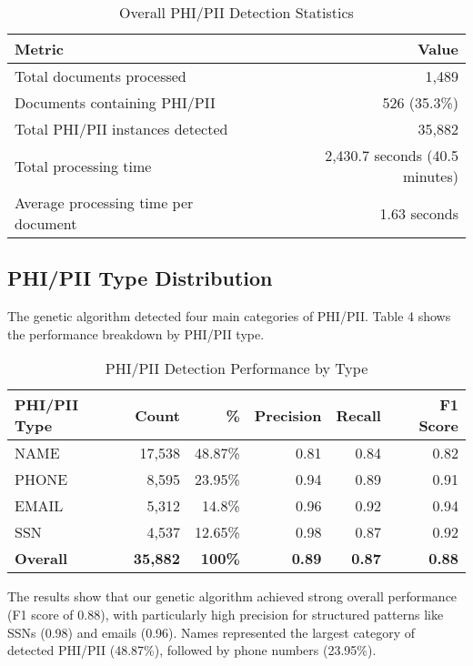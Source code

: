 \documentclass[conference]{IEEEtran}
\begin{document}
\begin{table}[htbp]
\caption{Overall PHI/PII Detection Statistics}
\centering
\renewcommand{\arraystretch}{2.5}
\begin{tabular}{|l|r|}
\hline
\textbf{Metric} & \textbf{Value} \\
\hline
Total documents processed & 1,489 \\
Documents containing PHI/PII & 526 (35.3\%) \\
Total PHI/PII instances detected & 35,882 \\
Total processing time & 2,430.7 seconds (40.5 minutes) \\
Average processing time per document & 1.63 seconds \\
\hline
\end{tabular}
\label{tab:overall-stats}
\end{table}

\subsection{\textbf{PHI/PII Type Distribution}}
The genetic algorithm detected four main categories of PHI/PII. Table 4 shows the performance breakdown by PHI/PII type.

\begin{table}[htbp]
\caption{PHI/PII Detection Performance by Type}
\centering
\renewcommand{\arraystretch}{2.5}
\begin{tabular}{|l|r|r|r|r|r|}
\hline
\textbf{PHI/PII Type} & \textbf{Count} & \textbf{\%} & \textbf{Precision} & \textbf{Recall} & \textbf{F1 Score} \\
\hline
NAME & 17,538 & 48.87\% & 0.81 & 0.84 & 0.82 \\
PHONE & 8,595 & 23.95\% & 0.94 & 0.89 & 0.91 \\
EMAIL & 5,312 & 14.8\% & 0.96 & 0.92 & 0.94 \\
SSN & 4,537 & 12.65\% & 0.98 & 0.87 & 0.92 \\
\textbf{Overall} & \textbf{35,882} & \textbf{100\%} & \textbf{0.89} & \textbf{0.87} & \textbf{0.88} \\
\hline
\end{tabular}
\label{tab:phi-pii-performance}
\end{table}

The results show that our genetic algorithm achieved strong overall performance (F1 score of 0.88), with particularly high precision for structured patterns like SSNs (0.98) and emails (0.96). Names represented the largest category of detected PHI/PII (48.87\%), followed by phone numbers (23.95\%).
\end{document}
